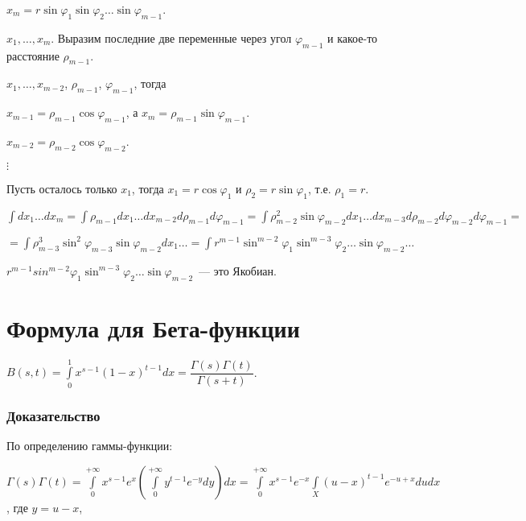 \documentclass{article}
\begin{document}
        $x_m = r \sin \varphi_1 \sin \varphi_2 \ldots \sin \varphi_{m - 1}$.
                    
        $x_1, \ldots, x_m$. Выразим последние две переменные через угол $\varphi_{m - 1}$ и какое-то расстояние $\rho_{m - 1}$.
                    
        $x_1, \ldots, x_{m - 2}$, $\rho_{m - 1}$, $\varphi_{m - 1}$, тогда
                    
        $x_{m - 1} = \rho_{m - 1} \cos \varphi_{m - 1}$, а $x_m = \rho_{m - 1} \sin \varphi_{m - 1}$.
    
        $x_{m - 2} = \rho_{m - 2} \cos \varphi_{m - 2}$.
                    
        $\vdots$
                    
        Пусть осталось только $x_1$, тогда $x_1 = r \cos \varphi_1$ и $\rho_2 = r \sin \varphi_1$, т.е. $\rho_1 = r$.
                    
        $\int dx_1 \ldots dx_m = \int \rho_{m - 1} dx_1 \ldots dx_{m - 2} d\rho_{m - 1} d \varphi_{m - 1} = \int \rho^2_{m - 2} \sin \varphi_{m - 2} dx_1\ldots dx_{m - 3} d \rho_{m - 2} d \varphi_{m - 2} d \varphi_{m - 1} =$
        
        $= \int \rho^3_{m - 3} \sin^2 \varphi_{m - 3} \sin \varphi_{m - 2} dx_1 \ldots = \int r^{m - 1} \sin^{m - 2} \varphi_1 \sin^{m - 3} \varphi_2 \ldots \sin \varphi_{m - 2} \ldots$
                    
        $r^{m - 1} sin^{m - 2} \varphi_1 \sin^{m - 3} \varphi_2 \ldots \sin \varphi_{m - 2}$~--- это Якобиан.
                
    \newpage
    
    \section{Формула для Бета-функции}
    
        $B(s, t) = \int\limits^1_0 x^{s - 1} (1 - x)^{t - 1} dx = \dfrac{\Gamma(s) \Gamma(t)}{\Gamma (s + t)}$.
            
        \subsubsection{Доказательство}
            
            По определению гаммы-функции:
            
            $\Gamma(s) \Gamma(t) = \int\limits^{+\infty}_0 x^{s - 1} e^x \left( \int\limits^{+\infty}_0 y^{t - 1} e^{-y}dy \right) dx = \int\limits^{+\infty}_0 x^{s - 1} e^{-x} \int\limits_X (u - x)^{t - 1} e^{-u + x} du dx$, где $y = u - x$, 
            
\end{document}
